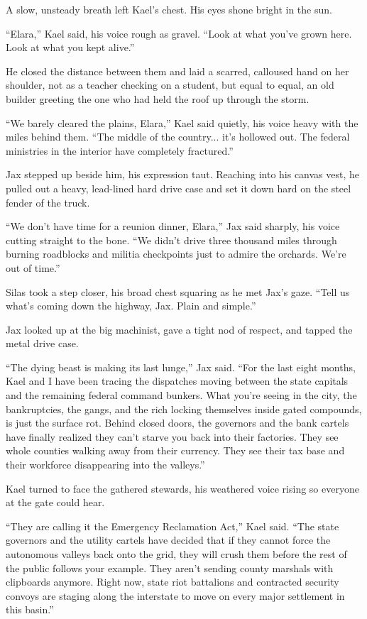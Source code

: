 A slow, unsteady breath left Kael’s chest. His eyes shone bright in the sun.

``Elara,'' Kael said, his voice rough as gravel. ``Look at what you’ve grown here. Look at what you kept alive.''

He closed the distance between them and laid a scarred, calloused hand on her shoulder, not as a teacher checking on a student, but equal to equal, an old builder greeting the one who had held the roof up through the storm.

``We barely cleared the plains, Elara,'' Kael said quietly, his voice heavy with the miles behind them. ``The middle of the country... it’s hollowed out. The federal ministries in the interior have completely fractured.''

Jax stepped up beside him, his expression taut. Reaching into his canvas vest, he pulled out a heavy, lead-lined hard drive case and set it down hard on the steel fender of the truck.

``We don't have time for a reunion dinner, Elara,'' Jax said sharply, his voice cutting straight to the bone. ``We didn't drive three thousand miles through burning roadblocks and militia checkpoints just to admire the orchards. We're out of time.''

Silas took a step closer, his broad chest squaring as he met Jax’s gaze. ``Tell us what's coming down the highway, Jax. Plain and simple.''

Jax looked up at the big machinist, gave a tight nod of respect, and tapped the metal drive case. 

``The dying beast is making its last lunge,'' Jax said. ``For the last eight months, Kael and I have been tracing the dispatches moving between the state capitals and the remaining federal command bunkers. What you're seeing in the city, the bankruptcies, the gangs, and the rich locking themselves inside gated compounds, is just the surface rot. Behind closed doors, the governors and the bank cartels have finally realized they can't starve you back into their factories. They see whole counties walking away from their currency. They see their tax base and their workforce disappearing into the valleys.''

Kael turned to face the gathered stewards, his weathered voice rising so everyone at the gate could hear.

``They are calling it the Emergency Reclamation Act,'' Kael said. ``The state governors and the utility cartels have decided that if they cannot force the autonomous valleys back onto the grid, they will crush them before the rest of the public follows your example. They aren't sending county marshals with clipboards anymore. Right now, state riot battalions and contracted security convoys are staging along the interstate to move on every major settlement in this basin.''

